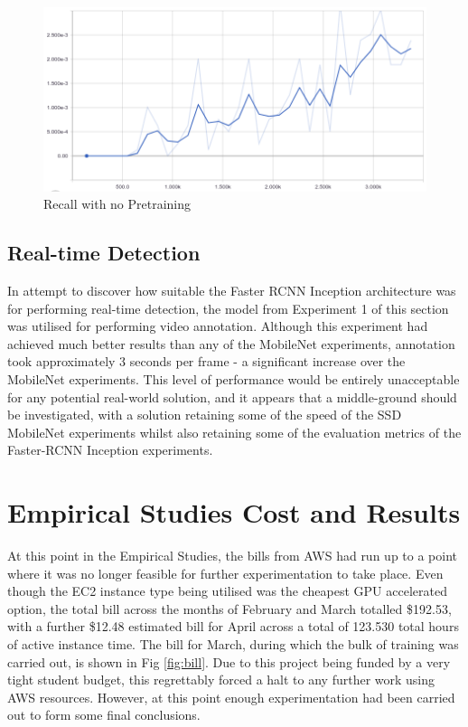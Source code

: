 \documentclass[12pt]{report}
\begin{document}
\vspace{0.5cm}
\begin{figure}[ht!]
	\centering
	\includegraphics[width=15cm]{no-ckpt-recall}
	\caption{Recall with no Pretraining}
	\label{fig:no-ckpt-recall}
\end{figure}

\clearpage
\subsection{Real-time Detection}
\begin{flushleft}
In attempt to discover how suitable the Faster RCNN Inception architecture was for performing real-time detection, the model from Experiment 1 of this section was utilised for performing video annotation. Although this experiment had achieved much better results than any of the MobileNet experiments, annotation took approximately 3 seconds per frame - a significant increase over the MobileNet experiments. This level of performance would be entirely unacceptable for any potential real-world solution, and it appears that a middle-ground should be investigated, with a solution retaining some of the speed of the SSD MobileNet experiments whilst also retaining some of the evaluation metrics of the Faster-RCNN Inception experiments.
\end{flushleft}

\newpage
\newpage
\section{Empirical Studies Cost and Results}
\begin{flushleft}
At this point in the Empirical Studies, the bills from AWS had run up to a point where it was no longer feasible for further experimentation to take place. Even though the EC2 instance type being utilised was the cheapest GPU accelerated option, the total bill across the months of February and March totalled \$192.53, with a further \$12.48 estimated bill for April across a total of 123.530 total hours of active instance time. The bill for March, during which the bulk of training was carried out, is shown in Fig \ref{fig:bill}. Due to this project being funded by a very tight student budget, this regrettably forced a halt to any further work using AWS resources. However, at this point enough experimentation had been carried out to form some final conclusions.
\end{flushleft}
\end{document}
